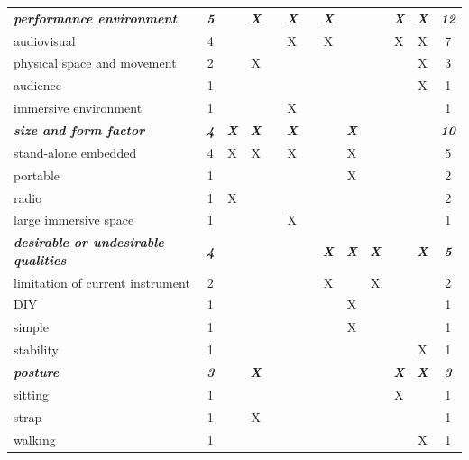 \documentclass[letterpaper, 12pt]{article}
\begin{document}
\begin{spacing}{1.1}
\begin{longtable}{L{5.3cm}cccccccccccc}
        \emph{\textbf{performance environment}} & \emph{\textbf{5}} & & \emph{\textbf{X}} & & \emph{\textbf{X}} & & \emph{\textbf{X}} & & & \emph{\textbf{X}} & \emph{\textbf{X}} & \emph{\textbf{12}} \\
        audiovisual                      & 4  &   &   &   & X &   & X &   &   & X & X & 7  \\
        physical space and movement     & 2  &   & X &   &   &   &   &   &   &   & X & 3  \\
        audience                         & 1  &   &   &   &   &   &   &   &   &   & X & 1  \\
        immersive environment            & 1  &   &   &   & X &   &   &   &   &   &   & 1  \\
        \hline
    
        \emph{\textbf{size and form factor}} & \emph{\textbf{4}} & \emph{\textbf{X}} & \emph{\textbf{X}} & & \emph{\textbf{X}} & & & \emph{\textbf{X}} & & & & \emph{\textbf{10}} \\
        stand-alone embedded             & 4  & X & X &   & X &   &   & X &   &   &   & 5  \\
        portable                         & 1  &   &   &   &   &   &   & X &   &   &   & 2  \\
        radio                            & 1  & X &   &   &   &   &   &   &   &   &   & 2  \\
        large immersive space            & 1  &   &   &   & X &   &   &   &   &   &   & 1  \\
        \hline
    
        \emph{\textbf{desirable or undesirable qualities}} & \emph{\textbf{4}} & & & & & & \emph{\textbf{X}} & \emph{\textbf{X}} & \emph{\textbf{X}} & & \emph{\textbf{X}} & \emph{\textbf{5}} \\
        limitation of current instrument & 2  &   &   &   &   &   & X &   & X &   &   & 2  \\ 
        DIY                              & 1  &   &   &   &   &   &   & X &   &   &   & 1  \\
        simple                           & 1  &   &   &   &   &   &   & X &   &   &   & 1  \\
        stability                        & 1  &   &   &   &   &   &   &   &   &   & X & 1  \\
        \hline
    
        \emph{\textbf{posture}} & \emph{\textbf{3}} & & \emph{\textbf{X}} & & & & & & & \emph{\textbf{X}} & \emph{\textbf{X}} & \emph{\textbf{3}} \\
        sitting                          & 1  &   &   &   &   &   &   &   &   & X &   & 1  \\
        strap                            & 1  &   & X &   &   &   &   &   &   &   &   & 1  \\
        walking                          & 1  &   &   &   &   &   &   &   &   &   & X & 1  \\
        \hline
    

\end{longtable}
\end{spacing}
\end{document}
